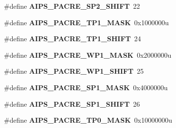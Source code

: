 \begin{DoxyCompactItemize}
\item 
\#define {\bfseries A\+I\+P\+S\+\_\+\+P\+A\+C\+R\+E\+\_\+\+S\+P2\+\_\+\+S\+H\+I\+FT}~22\hypertarget{group__AIPS__Register__Masks_gafcb298b0b5ed252387c93856098224bd}{}\label{group__AIPS__Register__Masks_gafcb298b0b5ed252387c93856098224bd}

\item 
\#define {\bfseries A\+I\+P\+S\+\_\+\+P\+A\+C\+R\+E\+\_\+\+T\+P1\+\_\+\+M\+A\+SK}~0x1000000u\hypertarget{group__AIPS__Register__Masks_gaea0dc80ac611772aae4f10faff9ae96e}{}\label{group__AIPS__Register__Masks_gaea0dc80ac611772aae4f10faff9ae96e}

\item 
\#define {\bfseries A\+I\+P\+S\+\_\+\+P\+A\+C\+R\+E\+\_\+\+T\+P1\+\_\+\+S\+H\+I\+FT}~24\hypertarget{group__AIPS__Register__Masks_gaaca8bd73da3c08ad627917ff79bbffe8}{}\label{group__AIPS__Register__Masks_gaaca8bd73da3c08ad627917ff79bbffe8}

\item 
\#define {\bfseries A\+I\+P\+S\+\_\+\+P\+A\+C\+R\+E\+\_\+\+W\+P1\+\_\+\+M\+A\+SK}~0x2000000u\hypertarget{group__AIPS__Register__Masks_gafd29af374483ffc1b35e5d02d5f3c1e7}{}\label{group__AIPS__Register__Masks_gafd29af374483ffc1b35e5d02d5f3c1e7}

\item 
\#define {\bfseries A\+I\+P\+S\+\_\+\+P\+A\+C\+R\+E\+\_\+\+W\+P1\+\_\+\+S\+H\+I\+FT}~25\hypertarget{group__AIPS__Register__Masks_ga2fc12a1dae4d9c77bb99592f5d7c86ba}{}\label{group__AIPS__Register__Masks_ga2fc12a1dae4d9c77bb99592f5d7c86ba}

\item 
\#define {\bfseries A\+I\+P\+S\+\_\+\+P\+A\+C\+R\+E\+\_\+\+S\+P1\+\_\+\+M\+A\+SK}~0x4000000u\hypertarget{group__AIPS__Register__Masks_gaade2c1c796d31fe32ec0e9e67ad8ce0c}{}\label{group__AIPS__Register__Masks_gaade2c1c796d31fe32ec0e9e67ad8ce0c}

\item 
\#define {\bfseries A\+I\+P\+S\+\_\+\+P\+A\+C\+R\+E\+\_\+\+S\+P1\+\_\+\+S\+H\+I\+FT}~26\hypertarget{group__AIPS__Register__Masks_ga1c62c1e50eb4b5cd08154d227806abdd}{}\label{group__AIPS__Register__Masks_ga1c62c1e50eb4b5cd08154d227806abdd}

\item 
\#define {\bfseries A\+I\+P\+S\+\_\+\+P\+A\+C\+R\+E\+\_\+\+T\+P0\+\_\+\+M\+A\+SK}~0x10000000u\hypertarget{group__AIPS__Register__Masks_gaaa3f95d1ad0c085fc78cec9950b0e4b3}{}\label{group__AIPS__Register__Masks_gaaa3f95d1ad0c085fc78cec9950b0e4b3}


\end{DoxyCompactItemize}
